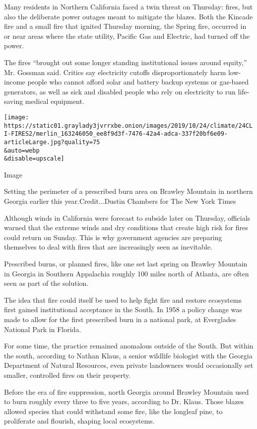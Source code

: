 Many residents in Northern California faced a twin threat on Thursday:
fires, but also the deliberate power outages meant to mitigate the
blazes. Both the Kincade fire and a small fire that ignited Thursday
morning, the Spring fire, occurred in or near areas where the state
utility, Pacific Gas and Electric, had turned off the power.

The fires ``brought out some longer standing institutional issues around
equity,'' Mr. Gossman said. Critics say electricity cutoffs
disproportionately harm low-income people who cannot afford solar and
battery backup systems or gas-based generators, as well as sick and
disabled people who rely on electricity to run life-saving medical
equipment.

\texttt{[image: https://static01.graylady3jvrrxbe.onion/images/2019/10/24/climate/24CLI-FIRES2/merlin\_163246050\_ee8f9d3f-7476-42a4-adca-337f20bf6e09-articleLarge.jpg?quality=75\\\&auto=webp\\\&disable=upscale]}

Image

Setting the perimeter of a prescribed burn area on Brawley Mountain in
northern Georgia earlier this year.Credit...Dustin Chambers for The New
York Times

Although winds in California were forecast to subside later on Thursday,
officials warned that the extreme winds and dry conditions that create
high risk for fires could return on Sunday. This is why government
agencies are preparing themselves to deal with fires that are
increasingly seen as inevitable.

Prescribed burns, or planned fires, like one set last spring on Brawley
Mountain in Georgia in Southern Appalachia roughly 100 miles north of
Atlanta, are often seen as part of the solution.

The idea that fire could itself be used to help fight fire and restore
ecosystems first gained institutional acceptance in the South. In 1958 a
policy change was made to allow for the first prescribed burn in a
national park, at Everglades National Park in Florida.

For some time, the practice remained anomalous outside of the South. But
within the south, according to Nathan Klaus, a senior wildlife biologist
with the Georgia Department of Natural Resources, even private
landowners would occasionally set smaller, controlled fires on their
property.

Before the era of fire suppression, north Georgia around Brawley
Mountain used to burn roughly every three to five years, according to
Dr. Klaus. Those blazes allowed species that could withstand some fire,
like the longleaf pine, to proliferate and flourish, shaping local
ecosystems.

